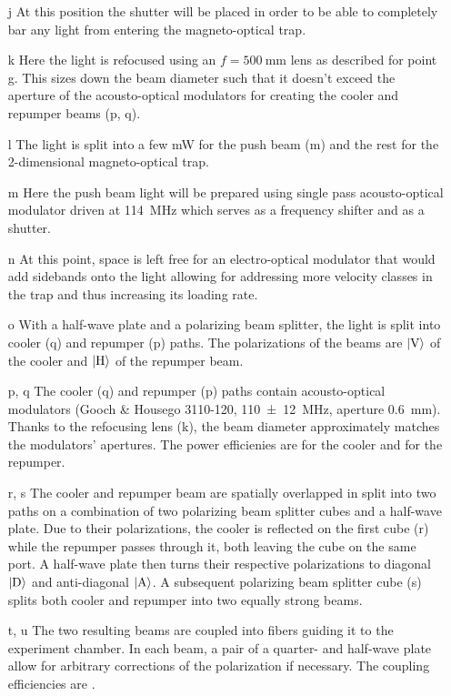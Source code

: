 \begin{itemize}
    \item[j] At this position the shutter will be placed in order to be able to completely bar any light from entering the magneto-optical trap.
    
    \item[k] Here the light is refocused using an $f = \SI{500}{\milli\meter}$ lens as described for point g. This sizes down the beam diameter such that it doesn't exceed the aperture of the acousto-optical modulators for creating the cooler and repumper beams (p, q).
    
    \item[l] The light is split into a few \si{\milli\watt} for the push beam (m) and the rest for the 2-dimensional magneto-optical trap.

    \item[m] Here the push beam light will be prepared using single pass acousto-optical modulator driven at \SI{+114}{\mega\hertz} which serves as a frequency shifter and as a shutter.
    
    \item[n] At this point, space is left free for an electro-optical modulator that would add sidebands onto the light allowing for addressing more velocity classes in the trap and thus increasing its loading rate.
    
    \item[o] With a half-wave plate and a polarizing beam splitter, the light is split into cooler (q) and repumper (p) paths. The polarizations of the beams are $\Ket{\text{V}}$ of the cooler and $\Ket{\text{H}}$ of the repumper beam.
    
    \item[p, q] The cooler (q) and repumper  (p) paths contain acousto-optical modulators (Gooch \& Housego 3110-120, \SI{110(12)}{\mega\hertz}, aperture \SI{0.6}{\milli\meter}). Thanks to the refocusing lens (k), the beam diameter approximately matches the modulators' apertures. The power efficienies are  for the cooler and for the repumper.
    
    \item[r, s] The cooler and repumper beam are spatially overlapped in split into two paths on a combination of two polarizing beam splitter cubes and a half-wave plate. Due to their polarizations, the cooler is reflected on the first cube (r) while the repumper passes through it, both leaving the cube on the same port. A half-wave plate then turns their respective polarizations to diagonal $\Ket{\text{D}}$ and anti-diagonal $\Ket{\text{A}}$. A subsequent polarizing beam splitter cube (s) splits both cooler and repumper into two equally strong beams.
    
    \item[t, u] The two resulting beams are coupled into fibers guiding it to the experiment chamber. In each beam, a pair of a quarter- and half-wave plate allow for arbitrary corrections of the polarization if necessary. The coupling efficiencies are .
\end{itemize}

